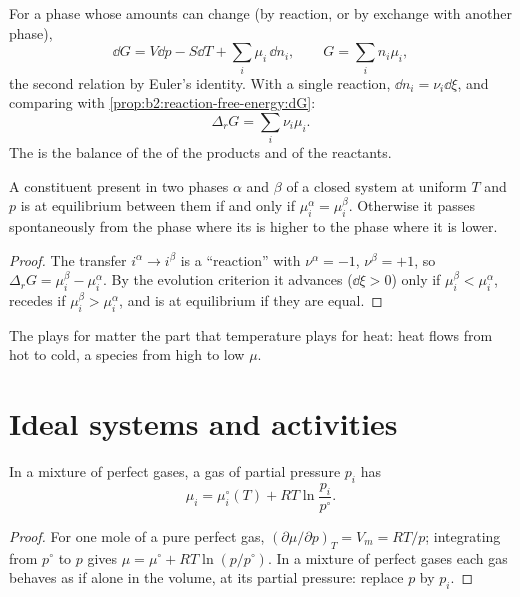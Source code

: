 For a phase whose amounts can change (by reaction, or by exchange with
another phase),
\[
  \dd G = V\dd p - S\dd T + \sum_i\mu_i\,\dd n_i ,\qquad G = \sum_i n_i\mu_i ,
\]
the second relation by Euler's identity. With a single reaction, $\dd n_i =
\nu_i\dd\xi$, and comparing with \cref{prop:b2:reaction-free-energy:dG}:
\[
  \Delta_r G = \sum_i\nu_i\mu_i .
\]
The  is the balance of the  of the
products and of the reactants.

\begin{theorem}\label{thm:b2:chemical-potential:phase-equilibrium}
A constituent present in two phases $\alpha$ and $\beta$ of a closed system at
uniform $T$ and $p$ is at equilibrium between them if and only if
$\mu_i^\alpha = \mu_i^\beta$. Otherwise it passes spontaneously from the
phase where its  is higher to the phase where it is lower.
\end{theorem}

\begin{proof}
The transfer $i^\alpha \to i^\beta$ is a ``reaction'' with $\nu^\alpha = -1$,
$\nu^\beta = +1$, so $\Delta_r G = \mu_i^\beta - \mu_i^\alpha$. By the
evolution criterion it advances ($\dd\xi > 0$) only if $\mu_i^\beta <
\mu_i^\alpha$, recedes if $\mu_i^\beta > \mu_i^\alpha$, and is at
equilibrium if they are equal.
\end{proof}

The  plays for matter the part that temperature plays
for heat: heat flows from hot to cold, a species from high to low $\mu$.

\section{Ideal systems and activities}

\begin{proposition}\label{prop:b2:chemical-potential:mu-gas}
In a mixture of perfect gases, a gas of partial pressure $p_i$ has
\[
  \mu_i = \mu_i^\circ(T) + RT\ln\frac{p_i}{p^\circ} .
\]
\end{proposition}

\begin{proof}
For one mole of a pure perfect gas, $(\partial\mu/\partial p)_T = V_m =
RT/p$; integrating from $p^\circ$ to $p$ gives $\mu = \mu^\circ + RT\ln(p/p^\circ)$.
In a mixture of perfect gases each gas behaves as if alone in the volume, at
its partial pressure: replace $p$ by $p_i$.
\end{proof}


